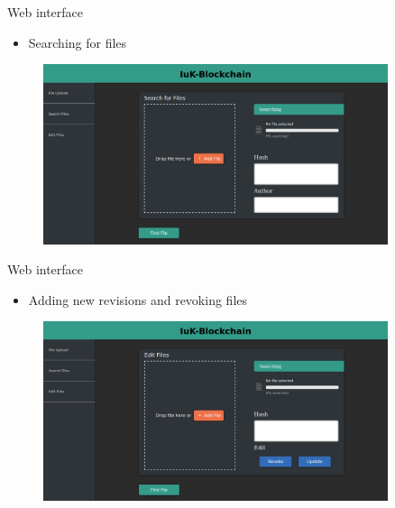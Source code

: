 \documentclass[10pt]{beamer}
\begin{document}
\begin{frame}{Web interface}
	\begin{itemize}
		\item Searching for files
	\end{itemize}
	\begin{figure}
		\includegraphics[width=0.9\textwidth]{images/search.png}
	\end{figure}
\end{frame}

\begin{frame}{Web interface}
	\begin{itemize}
		\item Adding new revisions and revoking files
	\end{itemize}
	\begin{figure}
		\includegraphics[width=0.9\textwidth]{images/edit.png}
	\end{figure}
\end{frame}

\end{document}
